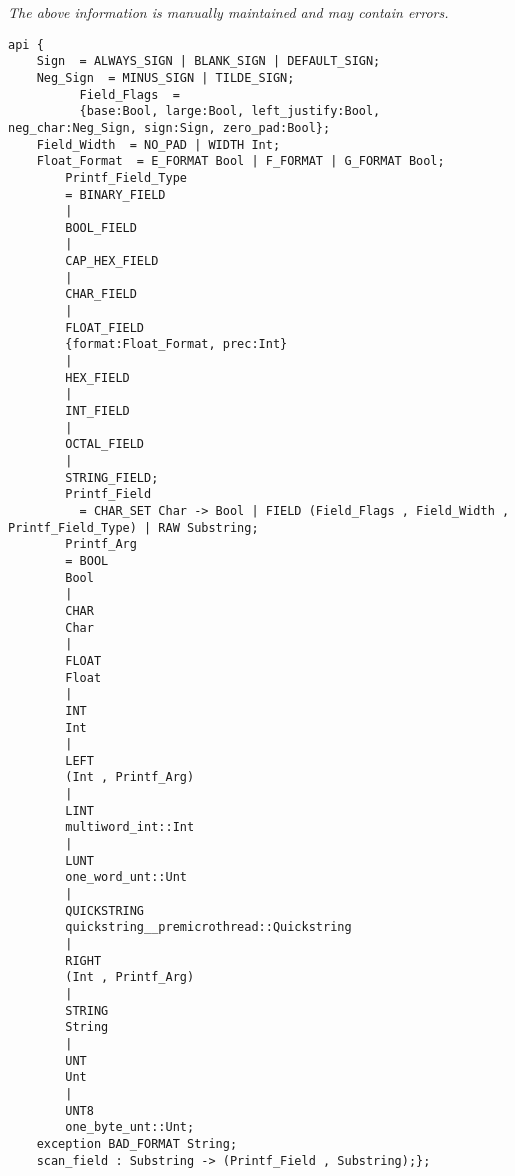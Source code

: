 \label{pkg:printf\_field}

{\tiny \it The above information is manually maintained and may contain errors.}
\begin{verbatim}
api {
    Sign  = ALWAYS_SIGN | BLANK_SIGN | DEFAULT_SIGN;
    Neg_Sign  = MINUS_SIGN | TILDE_SIGN;
          Field_Flags  =
          {base:Bool, large:Bool, left_justify:Bool, neg_char:Neg_Sign, sign:Sign, zero_pad:Bool};
    Field_Width  = NO_PAD | WIDTH Int;
    Float_Format  = E_FORMAT Bool | F_FORMAT | G_FORMAT Bool;
        Printf_Field_Type
        = BINARY_FIELD
        |
        BOOL_FIELD
        |
        CAP_HEX_FIELD
        |
        CHAR_FIELD
        |
        FLOAT_FIELD
        {format:Float_Format, prec:Int}
        |
        HEX_FIELD
        |
        INT_FIELD
        |
        OCTAL_FIELD
        |
        STRING_FIELD;
        Printf_Field
          = CHAR_SET Char -> Bool | FIELD (Field_Flags , Field_Width , Printf_Field_Type) | RAW Substring;
        Printf_Arg
        = BOOL
        Bool
        |
        CHAR
        Char
        |
        FLOAT
        Float
        |
        INT
        Int
        |
        LEFT
        (Int , Printf_Arg)
        |
        LINT
        multiword_int::Int
        |
        LUNT
        one_word_unt::Unt
        |
        QUICKSTRING
        quickstring__premicrothread::Quickstring
        |
        RIGHT
        (Int , Printf_Arg)
        |
        STRING
        String
        |
        UNT
        Unt
        |
        UNT8
        one_byte_unt::Unt;
    exception BAD_FORMAT String;
    scan_field : Substring -> (Printf_Field , Substring);};
\end{verbatim}

